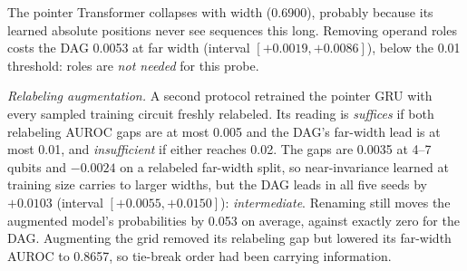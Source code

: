 \documentclass[conference,a4paper]{IEEEtran}
\begin{document}
The pointer Transformer collapses with width (0.6900), probably because its learned absolute positions never see sequences this long. Removing operand roles costs the DAG 0.0053 at far width (interval $[+0.0019,+0.0086]$), below the 0.01 threshold: roles are \emph{not needed} for this probe.

\emph{Relabeling augmentation.} A second protocol retrained the pointer GRU with every sampled training circuit freshly relabeled. Its reading is \emph{suffices} if both relabeling AUROC gaps are at most 0.005 and the DAG's far-width lead is at most 0.01, and \emph{insufficient} if either reaches 0.02. The gaps are 0.0035 at 4--7 qubits and $-0.0024$ on a relabeled far-width split, so near-invariance learned at training size carries to larger widths, but the DAG leads in all five seeds by $+0.0103$ (interval $[+0.0055,+0.0150]$): \emph{intermediate}. Renaming still moves the augmented model's probabilities by 0.053 on average, against exactly zero for the DAG. Augmenting the grid removed its relabeling gap but lowered its far-width AUROC to 0.8657, so tie-break order had been carrying information.
\end{document}
